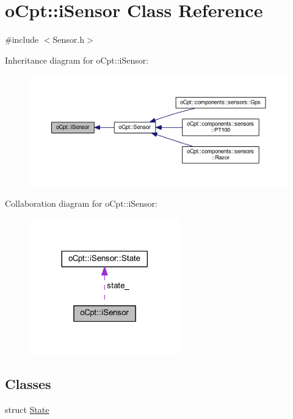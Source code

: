 \hypertarget{classo_cpt_1_1i_sensor}{}\section{o\+Cpt\+:\+:i\+Sensor Class Reference}
\label{classo_cpt_1_1i_sensor}


{\ttfamily \#include $<$Sensor.\+h$>$}



Inheritance diagram for o\+Cpt\+:\+:i\+Sensor\+:\nopagebreak
\begin{figure}[H]
\begin{center}
\leavevmode
\includegraphics[width=350pt]{classo_cpt_1_1i_sensor__inherit__graph}
\end{center}
\end{figure}


Collaboration diagram for o\+Cpt\+:\+:i\+Sensor\+:\nopagebreak
\begin{figure}[H]
\begin{center}
\leavevmode
\includegraphics[width=185pt]{classo_cpt_1_1i_sensor__coll__graph}
\end{center}
\end{figure}
\subsection*{Classes}
\begin{DoxyCompactItemize}
\item 
struct \hyperlink{structo_cpt_1_1i_sensor_1_1_state}{State}
\end{DoxyCompactItemize}
